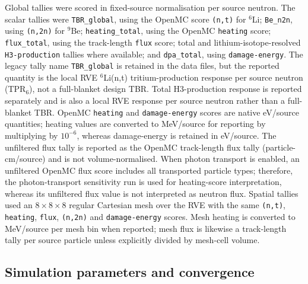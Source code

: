 \documentclass[preprint,12pt]{elsarticle}
\begin{document}
Global tallies were scored in fixed-source normalisation per source neutron.
The scalar tallies were \texttt{TBR\_global}, using the OpenMC score
\texttt{(n,t)} for $^6$Li; \texttt{Be\_n2n}, using \texttt{(n,2n)} for
$^9$Be; \texttt{heating\_total}, using the OpenMC \texttt{heating} score;
\texttt{flux\_total}, using the track-length \texttt{flux} score; total and
lithium-isotope-resolved \texttt{H3-production} tallies where available; and
\texttt{dpa\_total}, using \texttt{damage-energy}.  The legacy tally name
\texttt{TBR\_global} is retained in the data files, but the reported quantity
is the local RVE $^6$Li(n,t) tritium-production response per source neutron
(TPR$_6$), not a full-blanket design TBR.  Total H3-production response is
reported separately and is also a local RVE response per source neutron rather
than a full-blanket TBR.  OpenMC \texttt{heating} and \texttt{damage-energy}
scores are native eV/source
quantities; heating values are converted to MeV/source for reporting by
multiplying by $10^{-6}$, whereas damage-energy is retained in eV/source.
The unfiltered flux tally is reported as the OpenMC track-length flux tally
(particle-cm/source) and is not volume-normalised.  When photon transport is
enabled, an unfiltered OpenMC flux score includes all transported particle
types; therefore, the photon-transport sensitivity run is used for heating-score
interpretation, whereas its unfiltered flux value is not interpreted as neutron
flux.  Spatial tallies used an
$8\times8\times8$ regular Cartesian mesh over the RVE with the same
\texttt{(n,t)}, \texttt{heating}, \texttt{flux}, \texttt{(n,2n)} and
\texttt{damage-energy} scores.  Mesh heating is converted to MeV/source per
mesh bin when reported; mesh flux is likewise a track-length tally per source
particle unless explicitly divided by mesh-cell volume.

\subsection{Simulation parameters and convergence}
\end{document}
